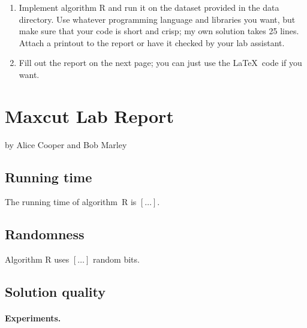 \documentclass{tufte-handout}
\begin{document}
\begin{enumerate}
\item Implement algorithm R and run it on the dataset provided in
  the data directory.
  Use whatever programming language and libraries you want, but make
  sure that your code is short and crisp; my own solution takes 25
  lines.
  Attach a printout to the report or have it checked by your lab
  assistant.
\item Fill out the report on the next page; you can just use the
  \LaTeX\ code if you want.
\end{enumerate}

\newpage


\newpage
\section{Maxcut Lab Report}


by Alice Cooper and Bob Marley

\subsection{Running time}

The running time of algorithm~R is $[\ldots]$.

\subsection{Randomness}

Algorithm R uses $[\ldots]$ random bits.

\subsection{Solution quality}

\paragraph{Experiments.}
\end{document}
